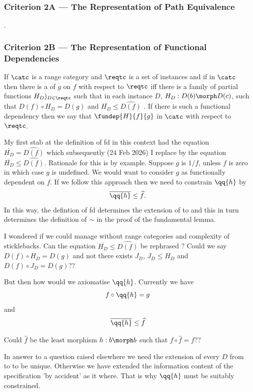 
\subsubsection{Criterion 2A --- The Representation of Path Equivalence}
\tbd
{}.
\subsubsection{Criterion 2B --- The Representation of Functional Dependencies}
\begin{definition}
If $\catc$ is a range category and $\reqtc$ is a set of instances and if \fgsourcediag
in $\catc$ then there is a   of $g$ on $f$ with respect to $\reqtc$ iff
there is a family of partial functions $H_D)_{D \in \reqtc}$ such that 
in each instance $D$,  $H_D: D(b) \morph D(c)$, such that $D(f) \circ H_D = D(g)$ and $\overline{H_D}\leq \widehat{D(f)}$ .
If there is such a functional dependency then we say that $\fundep{H}{f}{g}$ in $\catc$ with respect to $\reqtc$.

\begin{rationale}
My first stab at the definition of fd in this context had
the equation $\overline{H_D}=\widehat{D(f)}$ which
subsequently (24 Feb 2026)
I replace by the equation 
$\overline{H_D}\leq \widehat{D(f)}$. 
Rationale for this is by example. Suppose $g$ is $1/f$, 
unless $f$ is zero in which case $g$ is undefined. 
We would want to consider  $g$ as functionally dependent on $f$. 
If we follow this approach then we need to constrain
$\qq{h}$ by 
$$
\overline{\qq{h}} \leq \widehat{f}.
$$
In this way, the defintion of fd determines  the
extension of \catcw to \catcpw and this in turn determines the definition of $\sim$ in the proof of the fundamental lemma.
\end{rationale}
\begin{rationale}
I wondered if  we could manage without range categories and complexity of sticklebacks.
Can the equation $\overline{H_D}\leq \widehat{D(f)}$ be rephrased ?
Could we say $D(f) \circ H_D =D(g)$ and not there exists
$J_D$, $J_D \leq H_D$ and $D(f) \circ J_D = D(g)$??

But then how would we axiomatise $\qq{h}$. Currently we have
$$
f \circ \qq{h} = g
$$
and
$$
\overline{\qq{h}} \leq \widehat{f}
$$

\begin{notebox}[wierdly] Could $\hat{f}$ be the least morphism $h: b \morph b$
such that $f \circ \hat{f} = f$?? 
\end{notebox}

In answer to a question raised elsewhere we need the extension of every $D$
from \catcw to \catcpw to be unique. Otherwise we have extended the information content of the specification 'by accident' as it where. That is why $\qq{h}$
must be suitably constrained.
\end{rationale}
\end{definition}

